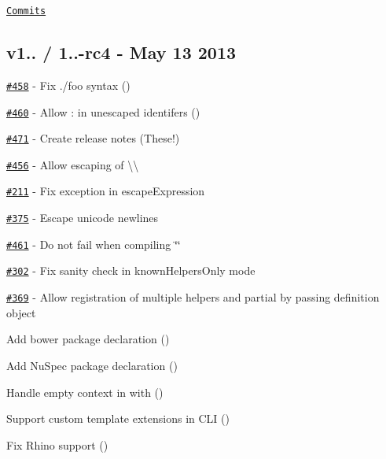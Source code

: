 \href{https://github.com/wycats/handlebars.js/compare/v1.0.11...v1.0.12}{\tt Commits}

\subsection*{v1.. / 1..-\/rc4 -\/ May 13 2013}


\begin{DoxyItemize}
\item \href{https://github.com/wycats/handlebars.js/issues/458}{\tt \#458} -\/ Fix {\ttfamily ./foo} syntax (\href{https://github.com/jpfiset}{\tt })
\item \href{https://github.com/wycats/handlebars.js/issues/460}{\tt \#460} -\/ Allow {\ttfamily \+:} in unescaped identifers (\href{https://github.com/jpfiset}{\tt })
\item \href{https://github.com/wycats/handlebars.js/issues/471}{\tt \#471} -\/ Create release notes (These!)
\item \href{https://github.com/wycats/handlebars.js/issues/456}{\tt \#456} -\/ Allow escaping of {\ttfamily \textbackslash{}\textbackslash{}}
\item \href{https://github.com/wycats/handlebars.js/issues/211}{\tt \#211} -\/ Fix exception in {\ttfamily escape\+Expression}
\item \href{https://github.com/wycats/handlebars.js/issues/375}{\tt \#375} -\/ Escape unicode newlines
\item \href{https://github.com/wycats/handlebars.js/issues/461}{\tt \#461} -\/ Do not fail when compiling {\ttfamily \char`\"{}\char`\"{}}
\item \href{https://github.com/wycats/handlebars.js/issues/302}{\tt \#302} -\/ Fix sanity check in known\+Helpers\+Only mode
\item \href{https://github.com/wycats/handlebars.js/issues/369}{\tt \#369} -\/ Allow registration of multiple helpers and partial by passing definition object
\item Add bower package declaration (\href{https://github.com/DevinClark}{\tt })
\item Add Nu\+Spec package declaration (\href{https://github.com/MikeMayer}{\tt })
\item Handle empty context in {\ttfamily with} (\href{https://github.com/thejohnfreeman}{\tt })
\item Support custom template extensions in C\+LI (\href{https://github.com/matteoagosti}{\tt })
\item Fix Rhino support (\href{https://github.com/broady}{\tt })

\end{DoxyItemize}
